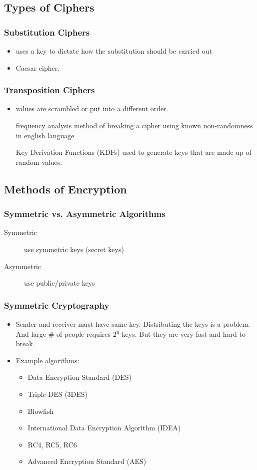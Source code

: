 \documentclass[11pt]{article}
\begin{document}
\subsection{Types of Ciphers}
\label{sec:org3415f18}
\subsubsection{Substitution Ciphers}
\label{sec:orga116621}
\begin{itemize}
\item uses a key to dictate how the substitution should be carried out
\item Caesar cipher.
\end{itemize}
\subsubsection{Transposition Ciphers}
\label{sec:org65d7a8b}
\begin{itemize}
\item values are scrambled or put into a different order.
\item[{frequency analysis}] method of breaking a cipher using known non-randomness in english language
\item[{Key Derivation Functions (KDFs)}] used to generate keys that are made up of random values.
\end{itemize}
\subsection{Methods of Encryption}
\label{sec:org3e071e2}
\subsubsection{Symmetric vs. Asymmetric Algorithms}
\label{sec:orgdc613ec}
\begin{description}
\item[{Symmetric}] use symmetric keys (secret keys)
\item[{Asymmetric}] use public/private keys
\end{description}
\subsubsection{Symmetric Cryptography}
\label{sec:orgb661d54}
\begin{itemize}
\item Sender and receiver must have same key. Distributing the keys is a problem. And large \# of people requires 2\(^{\text{n}}\) keys. But they are very fast and hard to break.
\item Example algorithms:
\begin{itemize}
\item Data Encryption Standard (DES)
\item Triple-DES (3DES)
\item Blowfish
\item International Data Encryption Algorithm (IDEA)
\item RC4, RC5, RC6
\item Advanced Encryption Standard (AES)
\end{itemize}
\end{itemize}
\end{document}
